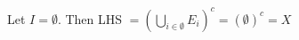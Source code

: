 \documentclass[preview]{standalone}
\begin{document}
\begin{center}
Let $I = \emptyset$. Then LHS $= (\bigcup_{i \in \emptyset} E_i)^c = (\emptyset)^c = X$
\end{center}
\end{document}
